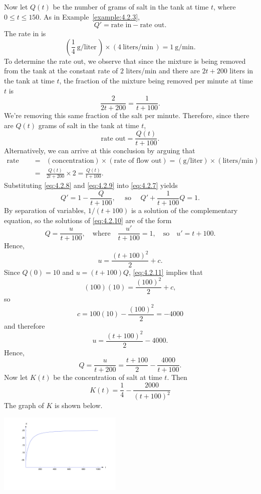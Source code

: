 \documentclass{ximera}
\begin{document}
\begin{example}
\begin{explanation}
Now let $Q(t)$ be the number of grams of salt in the tank
at time $t$, where  $0 \leq t \leq 150$.  As in Example~\ref{example:4.2.3},
\begin{equation} \label{eq:4.2.7}
Q' = \mbox{rate in}-\mbox{rate out}.
\end{equation}
 The rate in is
\begin{equation} \label{eq:4.2.8}
\left(\frac{1}{4}\  \mbox{g/liter}\,\right) \times (4\
\mbox{liters/min}\,) = 1\  \mbox{g/min}.
\end{equation}
 To determine the rate out, we observe that since
the mixture is being removed from the tank at the constant
rate of $2$ liters/min and there are $2t+200$
liters in the tank at time $t$, the fraction of the mixture
being removed per minute at time $t$ is
$$
\frac{2}{2t+200} = \frac{1}{t+100}.
$$
We're removing this same fraction of the salt per
minute.  Therefore, since there are $Q(t)$ grams of salt in
the tank at time $t$,
\begin{equation} \label{eq:4.2.9}
\mbox{rate out} = \frac{Q(t)}{t+100}.
\end{equation}
Alternatively, we can arrive at this conclusion by arguing that
$$
\begin{array}{lcl}
\mbox{rate out} & = & (\mbox{concentration})\times(\mbox{rate of
flow out})
=(\mbox{g/liter})\times(\mbox{liters/min})\\
&=&\frac{Q(t)}{2t+200}\times
2=\frac{Q(t)}{t+100}.
\end{array}
$$
 Substituting \eqref{eq:4.2.8} and \eqref{eq:4.2.9} into \eqref{eq:4.2.7}
yields
\begin{equation} \label{eq:4.2.10}
Q'=1-\frac{Q}{t+100},\quad\text{ so }\quad
Q'+\frac{1}{t+100} Q=1.
\end{equation}
By separation of variables, $1/(t+100)$ is a solution of the
complementary equation, so the solutions of \eqref{eq:4.2.10}
are of the form
$$
Q=\frac{u}{t+100},\quad\mbox{where}\quad\frac{u'}{t+100}=1,\quad\mbox{so}\quad u'=t+100.
$$
Hence,
\begin{equation} \label{eq:4.2.11}
u = \frac{(t+100)^2}{2}+c.
\end{equation}
Since $Q(0)=10$  and $u=(t+100)Q$, \eqref{eq:4.2.11} implies that
$$
(100)(10) = \frac{(100)^2}{2}+c,
$$
so
$$
c=100(10)-\frac{(100)^2}{2} =-4000
$$
and therefore
$$
u = \frac{(t+100)^2}{2} -4000.
$$
 Hence,
 $$
Q = \frac{u}{t+200}= \frac{t+100}{2}-\frac{4000}{t+100}.
$$
Now let $K(t)$ be the concentration of salt at
time $t$.  Then
$$
K(t) = \frac{1}{4}-\frac{2000}{(t+100)^2}
$$
The graph of $K$ is shown below.
\begin{image}
  \includegraphics[height=1.5in]{fig040206.jpg} 
\end{image}


\end{explanation}
\end{example}
\end{document}
